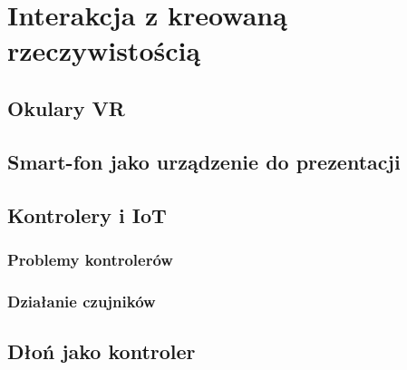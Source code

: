 \chapter{Interakcja z kreowaną rzeczywistością}
\label{ch:prezentacja}

\section{Okulary VR}
\label{sec:okulary}

\section{Smart-fon jako urządzenie do prezentacji}
\label{sec:smartphone}

\section{Kontrolery i IoT}
\label{sec:iot}

	\subsection{Problemy kontrolerów}
	\label{subsec:problemy}
	
	\subsection{Działanie czujników}
	\label{subsec:dzialanie}
\section{Dłoń jako kontroler}
\label{sec:dlon}
